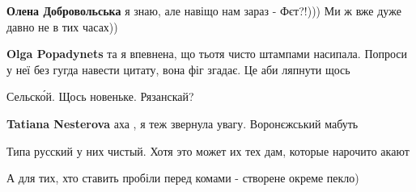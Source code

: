 \begin{itemize}
\begin{itemize}
\textbf{Олена Добровольська} я знаю, але навіщо нам зараз - Фєт?!))) Ми ж вже дуже давно не в тих часах))

 
\textbf{Olga Popadynets} та я впевнена, що тьотя чисто штампами насипала. Попроси у неї без гугда навести цитату, вона фіг згадає. Це аби ляпнути щось
\end{itemize}

 
Сельско́й. Щось новеньке. Рязанскай?

\begin{itemize}
 
\textbf{Tatiana Nesterova} аха , я теж звернула увагу. Воронєжський мабуть
\end{itemize}

 
Типа русский у них чистый. Хотя это может их тех дам, которые нарочито акают

 
А для тих, хто ставить пробіли перед комами - створене окреме пекло)

 

\end{itemize}
